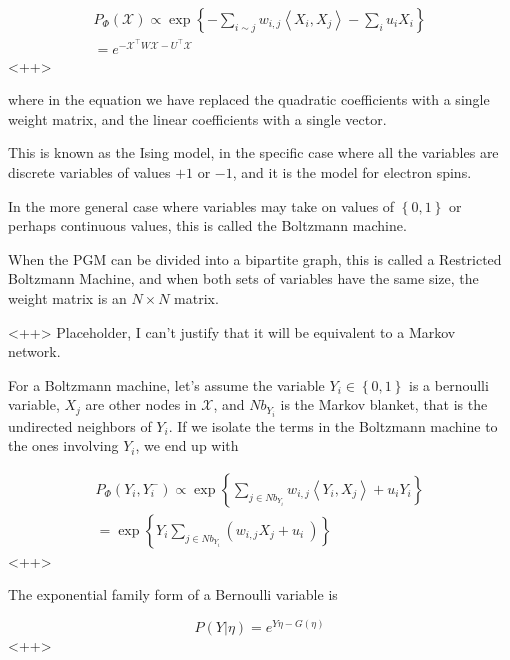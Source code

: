 \documentclass[a4paper]{article}
\begin{document}
\begin{equation}
  \begin{split}
    P_{\Phi}( \mathcal{X} ) \propto \exp \left\{ - \sum_{ i \sim j} w_{i,j} \left< X_i, X_j \right> - \sum_i u_i X_i \right\} \\
    = e^{ - \mathcal{X}^{ \intercal } W \mathcal{X} - U^{\intercal} \mathcal{X} }
  \end{split}
  \label{<++>}
\end{equation}<++>

where in the equation we have replaced the quadratic coefficients with a single weight matrix, and the linear coefficients with a single vector. 

This is known as the Ising model, in the specific case where all the variables are discrete variables of values $+1$ or $-1$, and it is the model for electron spins.

In the more general case where variables may take on values of $\left\{ 0,1 \right\}$ or perhaps continuous values, this is called the Boltzmann machine.

When the PGM can be divided into a bipartite graph, this is called a Restricted Boltzmann Machine, and when both sets of variables have the same size, the weight matrix is an $N \times N$ matrix.

<++>
Placeholder, I can't justify that it will be equivalent to a Markov network. 

For a Boltzmann machine, let's assume the variable $Y_i \in \left\{ 0, 1 \right\}$ is a bernoulli variable, $X_j$ are other nodes in $\mathcal{X}$, and $Nb_{Y_i}$ is the Markov blanket, that is the undirected neighbors of $Y_i$. 
If we isolate the terms in the Boltzmann machine to the ones involving $Y_i$, we end up with

\begin{equation}
  \begin{split}
    P_{\Phi}(Y_i, Y_i^{-}) \propto \exp\left\{ \sum_{j \in Nb_{Y_i}} w_{i,j} \left< Y_i, X_j \right> + u_i Y_i \right\} \\
    = \exp \left\{ Y_i \sum_{j \in Nb_{Y_i}} \left( w_{i,j} X_j + u_i\ \right) \right\}
  \end{split}
  \label{<++>}
\end{equation}<++>

The exponential family form of a Bernoulli variable is

\begin{equation}
  P( Y \vert \eta ) = e^{Y \eta - G(\eta)}
  \label{<++>}
\end{equation}<++>
\end{document}
